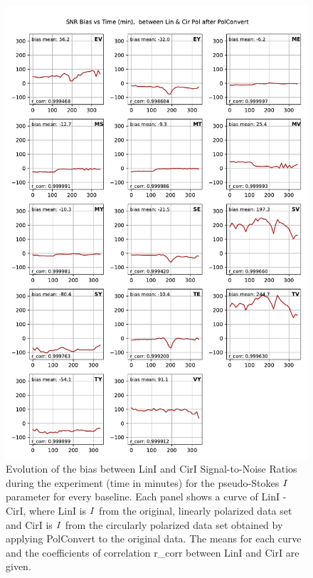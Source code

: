 \documentclass[letterpaper,twoside,12pt]{article}
\begin{document}
\begin{figure}[ht!]
  \begin{center}
  \includegraphics[width=33pc]{SNR_bias_between_Lin_I_and_Cir_I.pdf}
  \caption{\small Evolution of the bias between LinI and CirI Signal-to-Noise Ratios during the experiment (time in minutes) for the pseudo-Stokes $\protect I$ parameter for every baseline. Each panel shows a curve of LinI - CirI, where LinI is $\protect I$ from the original, linearly polarized data set and CirI is $\protect I$ from the circularly polarized data set obtained by applying PolConvert to the original data. The means for each curve and the coefficients of correlation r\_corr between LinI and CirI are given.}
  \label{snr_lin_cir_bias}
  \end{center}
\end{figure}
\end{document}
